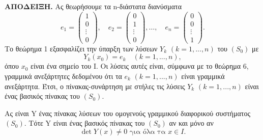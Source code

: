 \documentclass[11pt,a4paper,twoside]{book}
\newcommand{\titlefont}[1]{{\fontfamily{maksf}\selectfont #1}}
\newcounter{thewrhma}[chapter]
\renewcommand{\thethewrhma}{\thechapter.\arabic{thewrhma}}
\newcommand{\thewr}{\refstepcounter{thewrhma}{\bf\titlefont{\textcolor{secondarycolor}{\large Θεώρημα\hspace{2mm}\thethewrhma}}}\hspace{1mm}}{}
\newenvironment{Thewrhma}[1]
{\begin{tcolorbox}[title=\thewr\ \ :\ \  {\textcolor{black}{\bf{\large\titlefont{#1}}}},
breakable,
enhanced standard,
titlerule=-.2pt,
toprule=0pt, 
rightrule=0pt, 
bottomrule=0pt,
colback=white,
left=2mm,
top=1mm,
bottom=0mm,
boxrule=0pt,
colframe=white,
borderline west={1.5mm}{0pt}{secondarycolor},
leftrule=2mm,
sharp corners,
coltitle=secondarycolor]}
{\end{tcolorbox}}
\begin{document}
\textbf{ΑΠΟΔΕΙΞΗ.} Ας θεωρήσουμε τα n-διάστατα διανύσματα
\[
e_1 = 
\begin{pmatrix}
1 \\ 0 \\ \vdots \\ 0
\end{pmatrix}
, \quad
e_2 = 
\begin{pmatrix}
0 \\ 1 \\ \vdots \\ 0
\end{pmatrix}
, \dots, \quad
e_n = 
\begin{pmatrix}
0 \\ 0 \\ \vdots \\ 1
\end{pmatrix}
.
\]
Το θεώρημα 1 εξασφαλίζει την ύπαρξη των λύσεων $Y_k$ $(k=1,...,n)$ του $(S_0)$ με
\[
Y_k(x_0) = e_k \quad (k=1,...,n),
\]
όπου $x_0$ είναι ένα σημείο του Ι. Οι λύσεις αυτές είναι, σύμφωνα με το θεώρημα 6, γραμμικά ανεξάρτητες δεδομένου ότι τα $e_k$ $(k=1,...,n)$ είναι γραμμικά ανεξάρτητα. Έτσι, ο πίνακας-συνάρτηση με στήλες τις λύσεις $Y_k$ $(k=1,...,n)$ είναι ένας βασικός πίνακας του $(S_0)$.

\begin{Thewrhma}{}
Ας είναι Y ένας πίνακας λύσεων του ομογενούς γραμμικού διαφορικού συστήματος $(S_0)$. Τότε Y είναι ένας βασικός πίνακας του $(S_0)$ αν και μόνο αν
\[
\det Y(x) \neq 0 \text{ για όλα τα } x \in I.
\]
\end{Thewrhma}
\end{document}
